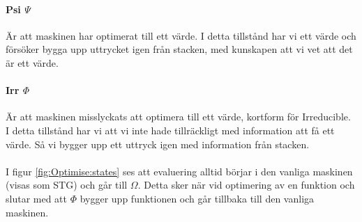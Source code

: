\documentclass[Rapport]{subfiles}
\begin{document}
\paragraph{Psi $\Psi$} Är att maskinen har optimerat till ett värde. I detta tillstånd
har vi ett värde och försöker bygga upp uttrycket igen från stacken, med kunskapen att vi vet
att det är ett värde.

\paragraph{Irr $\Phi$} Är att maskinen misslyckats att optimera till ett värde, kortform för Irreducible.
I detta tillstånd har vi att vi inte hade tillräckligt med information att få ett
värde. Så vi bygger upp ett uttryck igen med information från stacken.

\paragraph{}
I figur \ref{fig:Optimise:states} ses att evaluering alltid börjar i den vanliga maskinen
 (visas som STG) och går till $\Omega$. Detta sker när vid optimering av en funktion
och slutar med att $\Phi$ bygger upp funktionen och går tillbaka till den vanliga maskinen.

\stgOptimise















\end{document}
